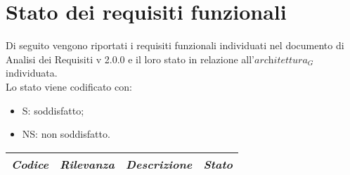 \section{Stato dei requisiti funzionali}
Di seguito vengono riportati i requisiti funzionali individuati nel documento di Analisi dei Requisiti v 2.0.0 e il loro stato in relazione all'$\textit{architettura}_G$ individuata.\\
Lo stato viene codificato con:
\begin{itemize}
    \item S: soddisfatto;
    \item NS: non soddisfatto.
\end{itemize}

\begin{longtable}{|c|c|p{12cm}|c|}
\hline
\emph{Codice} & \emph{Rilevanza} & \emph{Descrizione} & \emph{Stato} \\
\hline
\endhead
\hline


\end{longtable}
